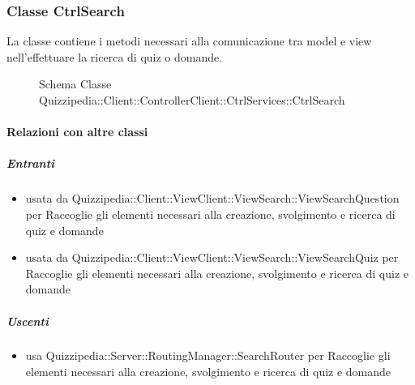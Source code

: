 \subsubsection{Classe CtrlSearch}
La classe contiene i metodi necessari alla comunicazione tra model e view nell'effettuare la ricerca di quiz o domande.
\begin{figure}[H]
\centering
\noindent{}
\caption[Schema Classe CtrlSearch]{Schema Classe Quizzipedia::Client::ControllerClient::CtrlServices::CtrlSearch}
\end{figure}
\paragraph{Relazioni con altre classi}
\subparagraph{Entranti}
\begin{itemize}
\item usata da Quizzipedia::Client::ViewClient::ViewSearch::ViewSearchQuestion per Raccoglie gli elementi necessari alla creazione, svolgimento e ricerca di quiz e domande
\item usata da Quizzipedia::Client::ViewClient::ViewSearch::ViewSearchQuiz per Raccoglie gli elementi necessari alla creazione, svolgimento e ricerca di quiz e domande
\end{itemize}
\subparagraph{Uscenti}
\begin{itemize}
\item usa Quizzipedia::Server::RoutingManager::SearchRouter per Raccoglie gli elementi necessari alla creazione, svolgimento e ricerca di quiz e domande
\end{itemize}
